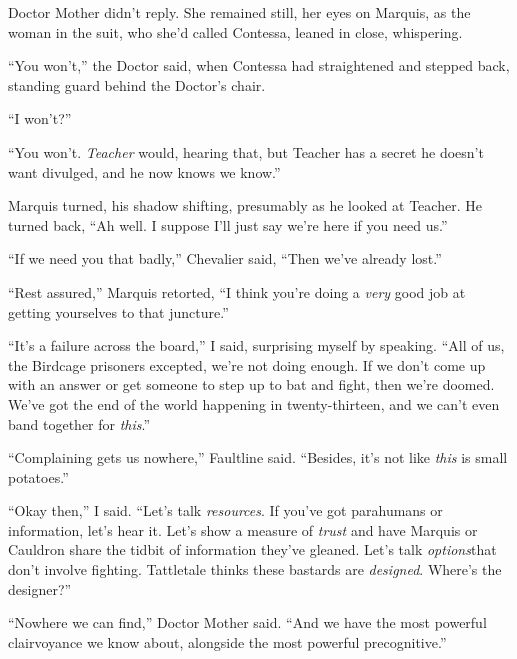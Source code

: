 Doctor Mother didn't reply.  She remained still, her eyes on Marquis, as the woman in the suit, who she'd called Contessa, leaned in close, whispering.



``You won't,'' the Doctor said, when Contessa had straightened and stepped back, standing guard behind the Doctor's chair.



``I won't?''



``You won't.  \emph{Teacher} would, hearing that, but Teacher has a secret he doesn't want divulged, and he now knows we know.''



Marquis turned, his shadow shifting, presumably as he looked at Teacher.  He turned back, ``Ah well.  I suppose I'll just say we're here if you need us.''



``If we need you that badly,'' Chevalier said, ``Then we've already lost.''



``Rest assured,'' Marquis retorted, ``I think you're doing a \emph{very} good job at getting yourselves to that juncture.''



``It's a failure across the board,'' I said, surprising myself by speaking.  ``All of us, the Birdcage prisoners excepted, we're not doing enough.  If we don't come up with an answer or get someone to step up to bat and fight, then we're doomed.  We've got the end of the world happening in twenty-thirteen, and we can't even band together for \emph{this}.''



``Complaining gets us nowhere,'' Faultline said. ``Besides, it's not like \emph{this} is small potatoes.''



``Okay then,'' I said.  ``Let's talk \emph{resources}.  If you've got parahumans or information, let's hear it.  Let's show a measure of \emph{trust} and have Marquis or Cauldron share the tidbit of information they've gleaned.  Let's talk \emph{options}that don't involve fighting.  Tattletale thinks these bastards are \emph{designed}.  Where's the designer?''



``Nowhere we can find,'' Doctor Mother said.  ``And we have the most powerful clairvoyance we know about, alongside the most powerful precognitive.''



